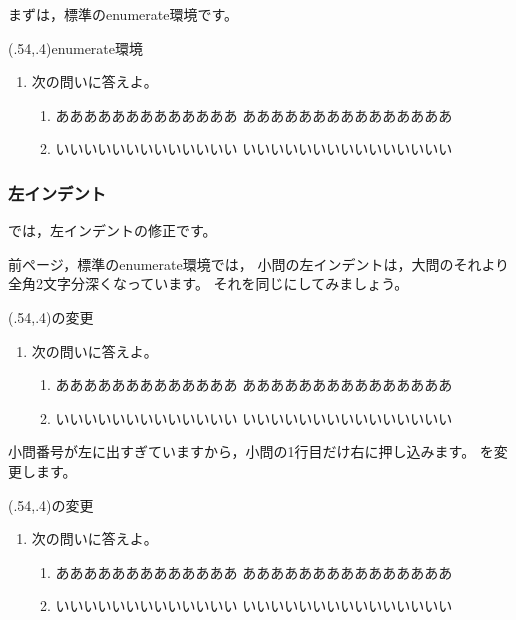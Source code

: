 \documentclass[fleqn,a4j]{jarticle}
\begin{document}
まずは，標準の\textsf{enumerate}環境です。

\begin{showEx}(.54,.4){\textsf{enumerate}環境}
\begin{enumerate}[1.~]
  \item 次の問いに答えよ。
    \begin{enumerate}[(1)]
      \item あああああああああああああ
        あああああああああああああああ
      \item いいいいいいいいいいいいい
        いいいいいいいいいいいいいいい
    \end{enumerate}
\end{enumerate}
\end{showEx}

\clearpage

\subsubsection{左インデント}
では，左インデントの修正です。

前ページ，標準の\textsf{enumerate}環境では，
小問の左インデントは，大問のそれより全角2文字分深くなっています。
それを同じにしてみましょう。

\begin{showEx}(.54,.4){の変更}
\begin{enumerate}[1.~]
  \item 次の問いに答えよ。
    \begin{enumerate}%
    <apnenum={\zw}>[(1)]
      \item あああああああああああああ
        あああああああああああああああ
      \item いいいいいいいいいいいいい
        いいいいいいいいいいいいいいい
    \end{enumerate}
\end{enumerate}
\end{showEx}

小問番号が左に出すぎていますから，小問の1行目だけ右に押し込みます。
を変更します。

\begin{showEx}(.54,.4){の変更}
\begin{enumerate}[1.~]
  \item 次の問いに答えよ。
    \begin{enumerate}%
    <apnenum={\zw%
              \zw%
             }>[(1)]
      \item あああああああああああああ
        あああああああああああああああ
      \item いいいいいいいいいいいいい
        いいいいいいいいいいいいいいい
    \end{enumerate}
\end{enumerate}
\end{showEx}
\end{document}

